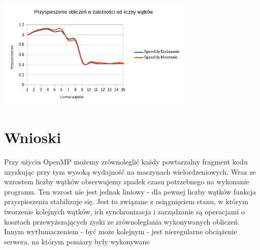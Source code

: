 \documentclass[a4paper,12pt]{article}
\begin{document}
\begin{center}
\includegraphics[width=0.7\textwidth]{data/przysp.png}
\end{center}

\section*{Wnioski}
Przy użyciu OpenMP możemy zrównoleglić każdy powtarzalny fragment kodu uzyskując przy tym wysoką wydajność na maszynach wielordzeniowych. 
Wraz ze wzrostem liczby wątków obserwujemy spadek czasu potrzebnego na wykonanie programu. Ten wzrost nie jest jednak liniowy - dla pewnej liczby wątków funkcja przyspieszenia stabilizuje się. Jest to związane z osiągnięciem stanu, w którym tworzenie kolejnych wątków, ich synchronizacja i zarządzanie są operacjami o kosztach przewyższających zyski ze zrównoleglania wykonywanych obliczeń.
Innym wytłumaczeniem - być może kolejnym - jest nieregularne obciążenie serwera, na którym pomiary były wykonywane
\end{document}
